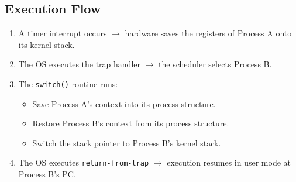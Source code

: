 \subsection{Execution Flow}
\begin{enumerate}
    \item A timer interrupt occurs $\rightarrow$ hardware saves the registers of Process A onto its kernel stack.
    \item The OS executes the trap handler $\rightarrow$ the scheduler selects Process B.
    \item The \texttt{switch()} routine runs:
          \begin{itemize}
              \item Save Process A’s context into its process structure.
              \item Restore Process B’s context from its process structure.
              \item Switch the stack pointer to Process B’s kernel stack.
          \end{itemize}
    \item The OS executes \texttt{return-from-trap} $\rightarrow$ execution resumes in user mode at Process B’s PC.
\end{enumerate}